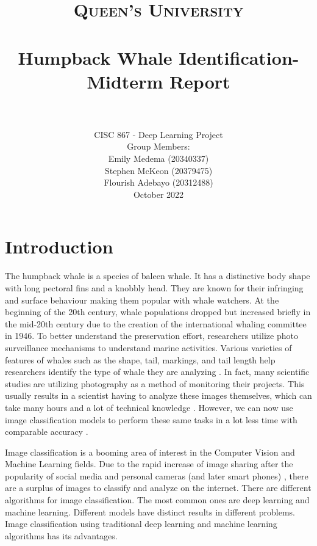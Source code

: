 \documentclass[paper=a4, fontsize=11pt]{scrartcl}
\title{
		\usefont{OT1}{bch}{b}{n}
		\normalfont \normalsize \textsc{Queen's University} \\ [25pt]
		\horrule{0.5pt} \\[0.4cm]
		\huge Humpback Whale Identification- Midterm Report \\
		\horrule{2pt} \\[0.5cm]
}
\author{
    \normalfont 
      CISC 867 - Deep Learning Project \\
    \normalfont
    Group Members: \\ 
    \normalsize
    Emily Medema (20340337) \\ 
    \normalsize
    Stephen McKeon (20379475) \\ 
    \normalsize
    Flourish Adebayo (20312488) \\
    October 2022 \\ [3pt]}
\date{\vspace{-5ex}}
\numberwithin{equation}{section}		%
\numberwithin{table}{section}				%
\begin{document}
\maketitle



\newpage 

\section*{Introduction}\label{sec: intro}
The humpback whale is a species of baleen whale. It has a distinctive body shape with long pectoral fins and a knobbly head. They are known for their infringing and surface behaviour making them popular with whale watchers\cite{kareiva2006whales}. At the beginning of the 20th century, whale populations dropped but increased briefly in the mid-20th century due to the creation of the international whaling committee in 1946\cite{henderson2022behavior}. To better understand the preservation effort, researchers utilize photo surveillance mechanisms to understand marine activities. Various varieties of features of whales such as the shape, tail, markings, and tail length help researchers identify the type of whale they are analyzing \cite{JaisakthiS.M.2017Awms}. In fact, many scientific studies are utilizing photography as a method of monitoring their projects. This usually results in a scientist having to analyze these images themselves, which can take many hours and a lot of technical knowledge \cite{JaisakthiS.M.2017Awms}. However, we can now use image classification models to perform these same tasks in a lot less time with comparable accuracy \cite{JaisakthiS.M.2017Awms}.

Image classification is a booming area of interest in the Computer Vision and Machine Learning fields. Due to the rapid increase of image sharing after the popularity of social media and personal cameras (and later smart phones) \cite{jain2000statistical}, there are a surplus of images to classify and analyze on the internet. There are different algorithms for image classification. The most common ones are deep learning and machine learning. Different models have distinct results in different problems. Image classification using traditional deep learning and machine learning algorithms has its advantages. 
\end{document}
